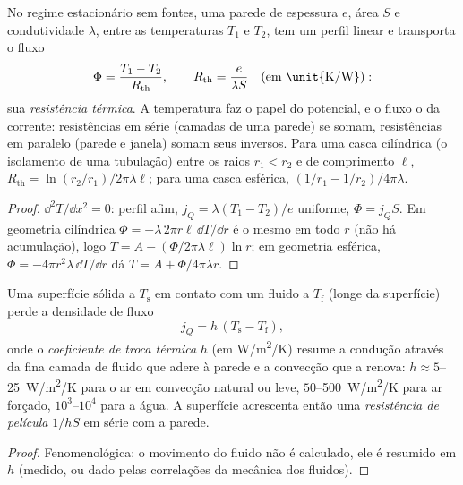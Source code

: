 \begin{proposition}\label{prop:b2:heat-conduction:resistance}
No regime estacionário sem fontes, uma parede de espessura $e$,
área $S$ e condutividade $\lambda$, entre as temperaturas $T_1$ e
$T_2$, tem um perfil linear e transporta o fluxo
\[
\Phi = \frac{T_1 - T_2}{R_{\text{th}}}, \qquad
R_{\text{th}} = \frac{e}{\lambda S}\quad\text{(em \unit{K/W})} :
\]
sua \emph{resistência térmica}. A temperatura
faz o papel do potencial, e o fluxo o da corrente: resistências em
série (camadas de uma parede) se somam, resistências em paralelo (parede e
janela) somam seus inversos. Para uma casca cilíndrica (o isolamento de
uma tubulação) entre os raios $r_1 < r_2$ e de comprimento $\ell$,
$R_{\text{th}} = \ln(r_2/r_1)/2\pi\lambda\ell$; para uma casca esférica,
$(1/r_1 - 1/r_2)/4\pi\lambda$.
\end{proposition}

\begin{proof}
$\dd^2T/\dd x^2 = 0$: perfil afim, $j_Q = \lambda(T_1 - T_2)/e$
uniforme, $\Phi = j_QS$. Em geometria cilíndrica $\Phi = -\lambda\,2\pi
r\ell\,\dd T/\dd r$ é o mesmo em todo $r$ (não há acumulação), logo
$T = A - (\Phi/2\pi\lambda\ell)\ln r$; em geometria esférica, $\Phi =
-4\pi r^2\lambda\,\dd T/\dd r$ dá $T = A + \Phi/4\pi\lambda r$.
\end{proof}

\begin{proposition}\label{prop:b2:heat-conduction:newton}
Uma superfície sólida a $T_{\text{s}}$ em contato com um fluido a $T_{\text{f}}$
(longe da superfície) perde a densidade de fluxo
\[
j_Q = h\,(T_{\text{s}} - T_{\text{f}}) ,
\]
onde o \emph{coeficiente de troca térmica} $h$ (em \unit{W/m^2/K}) resume a condução através
da fina camada de fluido que adere à parede e a convecção que a
renova: $h \approx 5$--\qty{25}{W/m^2/K} para o ar em convecção natural ou
leve, $50$--\qty{500}{W/m^2/K} para ar forçado, $10^3$--$10^4$
para a água. A superfície acrescenta então uma \emph{resistência de película} $1/hS$ em
série com a parede.
\end{proposition}

\begin{proof}
Fenomenológica: o movimento do fluido não é calculado, ele é resumido
em $h$ (medido, ou dado pelas correlações da mecânica dos fluidos).
\end{proof}

